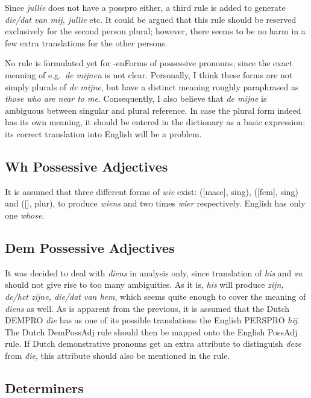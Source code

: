Since {\em jullie\/} does not have a posspro either, a 
third rule is added to generate {\em die/dat van mij, jullie\/} etc. It could 
be argued that this rule should be reserved exclusively for the second person 
plural; however, there seems to be no harm in a few extra translations for the 
other persons.

No rule is formulated yet for -enForms of possessive pronouns, since the exact 
meaning of e.g.\ {\em de mijnen\/} is not clear. Personally, I think these 
forms are not simply plurals of {\em de mijne\/}, but have a distinct meaning 
roughly paraphrased as {\em those who are near to me\/}. Consequently, I also 
believe that {\em de mijne\/} is ambiguous between singular and plural 
reference. In case the plural form indeed has its own meaning, it should be 
entered in the dictionary as a basic expression; its correct translation into 
English will be a problem.

\subsection{Wh Possessive Adjectives}

It is assumed that three different forms of {\em wie\/} exist: ([masc], sing), 
([fem], sing) and ([], plur), to produce {\em wiens\/} and two times 
{\em wier\/} respectively. English has only one {\em whose\/}.

\subsection{Dem Possessive Adjectives}

It was decided to deal with {\em diens\/} in analysis only, since translation 
of {\em his\/} and {\em su\/} should not give rise to too many ambiguities.
As it is, {\em his\/} will produce {\em zijn, de/het zijne, die/dat van hem\/}, 
which seems quite enough to cover the meaning of {\em diens\/} as well. As is 
apparent from the previous, it is assumed that the Dutch DEMPRO {\em die\/} has 
as one of its possible translations the English PERSPRO {\em hij\/}. The Dutch 
DemPossAdj rule should then be mapped onto the English PossAdj rule. If Dutch 
demonstrative pronouns get an extra attribute  to distinguish {\em deze\/} from 
{\em die\/}, this attribute should also be mentioned in the rule.

\subsection{Determiners}

